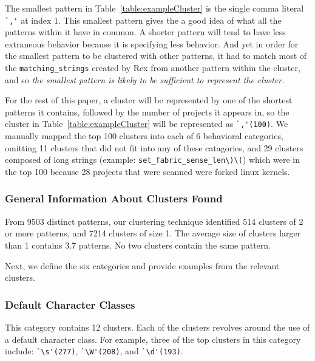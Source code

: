 The smallest pattern in Table~\ref{table:exampleCluster} is the single comma literal \verb!`,'! at index 1.  This smallest pattern gives the a good idea of what all the patterns within it have in common.  A shorter pattern will tend to have less extraneous behavior because it is specifying less behavior.  And yet in order for the smallest pattern to be clustered with other patterns, it had to match most of the {\tt matching\_strings} created by Rex from another pattern within the cluster, and so \emph{the smallest pattern is likely to be sufficient to represent the cluster}.

For the rest of this paper, a cluster will be represented by one of the shortest patterns it contains, followed by the number of projects it appears in, so the cluster in Table~\ref{table:exampleCluster} will be represented as \verb!`,'(100)!.
We  manually mapped the top 100 clusters into each of 6 behavioral categories, omitting 11 clusters that did not fit into any of these catagories, and 29 clusters composed of long strings (example: \verb!set_fabric_sense_len\)\(!) which were in the top 100 because 28 projects that were scanned were forked linux kernels.


\subsubsection{General Information About Clusters Found}
From 9503 distinct patterns, our clustering technique identified 514 clusters of 2 or more patterns, and 7214 clusters of size 1.  The average size of clusters larger than 1 contains 3.7 patterns.
No two clusters contain the same pattern.


Next, we define the six categories and provide examples from the relevant clusters.  

\subsubsection{Default Character Classes}
This category contains 12 clusters. Each of the clusters revolves around the use of a default character class. For example, three of the top clusters in this category include:
\verb!`\s'(277)!, \verb!`\W'(208)!, and \verb!`\d'(193)!.

